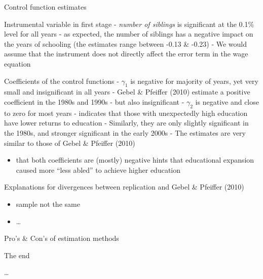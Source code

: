 \documentclass[10pt,ignorenonframetext,]{beamer}
\providecommand{\tightlist}{%
  \setlength{\itemsep}{0pt}\setlength{\parskip}{0pt}}
\begin{document}
\begin{frame}[allowframebreaks]{Control function estimates}
\protect\hypertarget{control-function-estimates}{}

Instrumental variable in first stage - \emph{number of siblings} is
significant at the 0.1\% level for all years - as expected, the number
of siblings has a negative impact on the years of schooling (the
estimates range between -0.13 \& -0.23) - We would assume that the
instrument does not directly affect the error term in the wage equation

Coefficients of the control functions - \(\gamma_1\) is negative for
majority of years, yet very small and insignificant in all years - Gebel
\& Pfeiffer (2010) estimate a positive coefficient in the 1980s and
1990s - but also insignificant - \(\gamma_2\) is negative and close to
zero for most years - indicates that those with unexpectedly high
education have lower returns to education - Similarly, they are only
slightly significant in the 1980s, and stronger significant in the early
2000s - The estimates are very similar to those of Gebel \& Pfeiffer
(2010)

\begin{itemize}
\tightlist
\item
  that both coefficients are (mostly) negative hints that educational
  expansion caused more ``less abled'' to achieve higher education
\end{itemize}

\end{frame}

\begin{frame}{Explanations for divergences between replication and Gebel
\& Pfeiffer (2010)}
\protect\hypertarget{explanations-for-divergences-between-replication-and-gebel-pfeiffer-2010}{}

\begin{itemize}
\tightlist
\item
  sample not the same
\item
  \ldots{}
\end{itemize}

\end{frame}

\begin{frame}{Pro's \& Con's of estimation methods}
\protect\hypertarget{pros-cons-of-estimation-methods}{}

\end{frame}

\begin{frame}{The end}
\protect\hypertarget{the-end}{}

\ldots{}

\end{frame}
\end{document}
